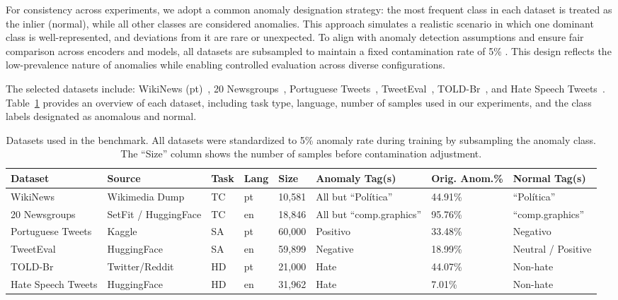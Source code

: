 \documentclass[12pt]{article}
\begin{document}
For consistency across experiments, we adopt a common anomaly designation strategy: the most frequent class in each dataset is treated as the inlier (normal), while all other classes are considered anomalies. This approach simulates a realistic scenario in which one dominant class is well-represented, and deviations from it are rare or unexpected. To align with anomaly detection assumptions and ensure fair comparison across encoders and models, all datasets are subsampled to maintain a fixed contamination rate of 5\% . This design reflects the low-prevalence nature of anomalies while enabling controlled evaluation across diverse configurations.

The selected datasets include: WikiNews (pt)~\cite{10.1371/journal.pone.0296929}, 20 Newsgroups~\cite{lang1995newsweeder}, Portuguese Tweets~\cite{Kaggle2018PortugueseTweets}, TweetEval~\cite{rosenthal2017semeval}, TOLD-Br~\cite{DBLP:journals/corr/abs-2010-04543}, and Hate Speech Tweets~\cite{sharma2018hate}. Table~\ref{tab:dataset-overview} provides an overview of each dataset, including task type, language, number of samples used in our experiments, and the class labels designated as anomalous and normal.

\vspace{-0.8em}
\renewcommand{\arraystretch}{0.9}
\begin{table}[ht]
\small
\centering
\caption{Datasets used in the benchmark. All datasets were standardized to 5\% anomaly rate during training by subsampling the anomaly class. The “Size” column shows the number of samples before contamination adjustment.}
\label{tab:dataset-overview}
\begin{tabular}{p{2.4cm} p{1.8cm} p{0.7cm} p{0.6cm} p{1.0cm} p{2.4cm} p{1.6cm} p{2.4cm}}
\toprule
\textbf{Dataset} & \textbf{Source} & \textbf{Task} & \textbf{Lang} & \textbf{Size} & \textbf{Anomaly Tag(s)} & \textbf{Orig. Anom.\%} & \textbf{Normal Tag(s)} \\
\midrule
WikiNews          & Wikimedia Dump       & TC & pt & 10,581  & All but “Política”      & 44.91\%  & “Política” \\
20 Newsgroups     & SetFit / HuggingFace & TC & en & 18,846  & All but “comp.graphics” & 95.76\%  & “comp.graphics” \\
Portuguese Tweets & Kaggle               & SA & pt & 60,000  & Positivo                & 33.48\%  & Negativo \\
TweetEval         & HuggingFace          & SA & en & 59,899  & Negative                & 18.99\%  & Neutral / Positive \\
TOLD-Br           & Twitter/Reddit       & HD & pt & 21,000  & Hate                    & 44.07\%  & Non-hate \\
Hate Speech Tweets& HuggingFace          & HD & en & 31,962  & Hate                    & 7.01\%   & Non-hate \\
\bottomrule
\end{tabular}
\end{table}
\vspace{-1.5em}
\end{document}
